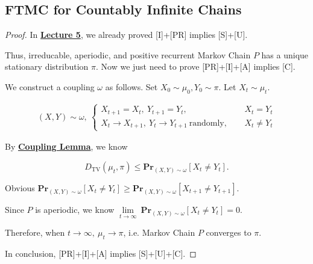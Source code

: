 \documentclass{article}
\renewcommand{\Pr}[2]{\mathbf{Pr}_{#1}\left[#2\right]}
\begin{document}
\subsection{FTMC for Countably Infinite Chains}
\vspace{1em}
\begin{proof}
    In \underline{\textbf{Lecture 5}}, we already proved [I]+[PR] implies [S]+[U].
    
    \hspace{1.3em}
    Thus, irreducable, aperiodic, and positive recurrent Markov Chain $P$ has a unique stationary distribution $\pi$. Now we just need to prove [PR]+[I]+[A] implies [C].
    
    \hspace{1.3em}
    We construct a coupling $\omega$ as follows. Set $X_0\sim\mu_0, Y_0\sim\pi$. Let $X_t\sim\mu_t$.
    
    \vspace{-2.3em}
    \begin{align*}
         (X,Y)\sim\omega, \ 
         \left\{\begin{array}{ll}
            X_{t+1}=X_t,\ Y_{t+1}=Y_t,  &  X_t=Y_t\\
            X_t\rightarrow X_{t+1},\ Y_t\rightarrow Y_{t+1}\ \text{randomly, }\quad  & X_t\neq Y_t
         \end{array}\right.
    \end{align*}
    
    \vspace{-0.5em} \hspace{1.3em}
    By \underline{\textbf{Coupling Lemma}}, we know
    
    \vspace{-1.5em}
    $$D_{\mathrm{TV}}(\mu_t,\pi)\le\Pr{(X,Y)\sim\omega}{X_t\neq Y_t}.$$
    
    \vspace{-0.39em} \hspace{1.3em}
    Obvious $\Pr{(X,Y)\sim\omega}{X_t\neq Y_t}\geq\Pr{(X,Y)\sim\omega}{X_{t+1}\neq Y_{t+1}}$. 
    
    \vspace{0.5em} \hspace{1.3em}
    Since $P$ is aperiodic, we know $\underset{t\rightarrow\infty}{\lim}\ \Pr{(X,Y)\sim\omega}{X_t\neq Y_t} = 0$.
    
    \vspace{0.3em} \hspace{1.3em}
    Therefore, when $t\rightarrow\infty,\ \mu_t\rightarrow\pi$, i.e. Markov Chain $P$ converges to $\pi.$
    
    \vspace{2em} \hspace{1.3em}
    In conclusion, [PR]+[I]+[A] implies [S]+[U]+[C].
\end{proof}
\end{document}
